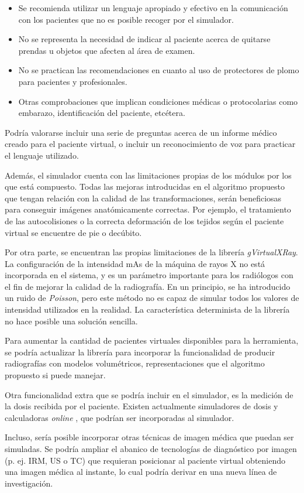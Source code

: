 \begin{itemize}
    \item Se recomienda utilizar un lenguaje apropiado y efectivo en la comunicación con los pacientes que no es posible recoger por el simulador.
    \item No se representa la necesidad de indicar al paciente acerca de quitarse prendas u objetos que afecten al área de examen.
    \item No se practican las recomendaciones en cuanto al uso de protectores de plomo para pacientes y profesionales.
    \item Otras comprobaciones que implican condiciones médicas o protocolarias como embarazo, identificación del paciente, etcétera.
\end{itemize}
Podría valorarse incluir una serie de preguntas acerca de un informe médico creado para el paciente virtual, o incluir un reconocimiento de voz para practicar el lenguaje utilizado. 

Además, el simulador cuenta con las limitaciones propias de los módulos por los que está compuesto. Todas las mejoras introducidas en el algoritmo propuesto que tengan relación con la calidad de las transformaciones, serán beneficiosas para conseguir imágenes anatómicamente correctas. Por ejemplo, el tratamiento de las autocolisiones o la correcta deformación de los tejidos según el paciente virtual se encuentre de pie o decúbito.


Por otra parte, se encuentran las propias limitaciones de la librería \emph{gVirtualXRay}. La configuración de la intensidad \acs{mAs} de la máquina de rayos X no está incorporada en el sistema, y es un parámetro importante para los radiólogos con el fin de mejorar la calidad de la radiografía. En un principio, se ha introducido un ruido de \emph{Poisson}, pero este método no es capaz de simular todos los valores de intensidad utilizados en la realidad. La característica determinista de la librería no hace posible una solución sencilla.

Para aumentar la cantidad de pacientes virtuales disponibles para la herramienta, se podría actualizar la librería para incorporar la funcionalidad de producir radiografías con modelos volumétricos, representaciones que el algoritmo propuesto si puede manejar.

Otra funcionalidad extra que se podría incluir en el simulador, es la medición de la dosis recibida por el paciente. Existen actualmente simuladores de dosis y calculadoras \emph{online} \cite{xraydose}, que podrían ser incorporadas al simulador.

Incluso, sería posible incorporar otras técnicas de imagen médica que puedan ser simuladas. Se podría ampliar el abanico de tecnologías de diagnóstico por imagen (p. ej. \acs{IRM}, \acs{US} o \acs{TC}) que requieran posicionar al paciente virtual obteniendo una imagen médica al instante, lo cual podría derivar en una nueva línea de investigación.










